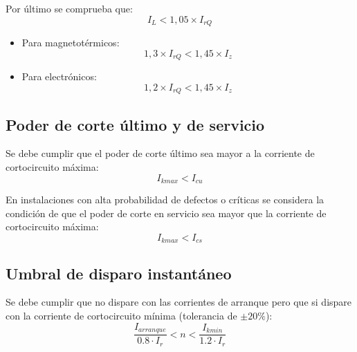 Por último se comprueba que:
\begin{equation}
	I_L< 1,05 \times I_{rQ}
\end{equation}
\begin{itemize}
	\item Para magnetotérmicos:
	\begin{equation}
		 1,3 \times I_{rQ} < 1,45 \times I_z
	\end{equation}
	\item Para electrónicos:
	\begin{equation}
		1,2 \times I_{rQ} < 1,45 \times I_z
	\end{equation}
\end{itemize}
\subsection{Poder de corte último y de servicio}
Se debe cumplir que el poder de corte último sea mayor a la corriente de cortocircuito máxima:
\begin{equation}
	I_{kmax} < I_{cu}
\end{equation}

En instalaciones con alta probabilidad de defectos o críticas se considera la condición de que el poder de corte en servicio sea mayor que la corriente de cortocircuito máxima:
\begin{equation}
	I_{kmax} < I_{cs}
\end{equation}
\subsection{Umbral de disparo instantáneo}
Se debe cumplir que no dispare con las corrientes de arranque pero que si dispare con la corriente de cortocircuito mínima (tolerancia de $\pm20\%$):
\begin{equation}
	\dfrac{I_{arranque}}{0.8\cdot I_r} < n < \dfrac{I_{kmin}}{1.2\cdot I_r}
\end{equation}
